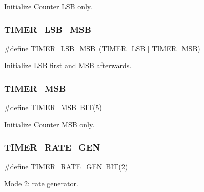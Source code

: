 Initialize Counter L\+SB only. 

\mbox{\label{group__i8254_ga8c0f1933323274c765e23837e4fbc8c7}} 
\subsubsection{\texorpdfstring{TIMER\_LSB\_MSB}{TIMER\_LSB\_MSB}}
{\footnotesize\ttfamily \#define T\+I\+M\+E\+R\+\_\+\+L\+S\+B\+\_\+\+M\+SB~(\mbox{\hyperlink{group__i8254_gac18cb814ebd0d67235392c330e0e3504}{T\+I\+M\+E\+R\+\_\+\+L\+SB}} $\vert$ \mbox{\hyperlink{group__i8254_ga2a8a6d363c612d756cd8d78480f7cd04}{T\+I\+M\+E\+R\+\_\+\+M\+SB}})}



Initialize L\+SB first and M\+SB afterwards. 

\mbox{\label{group__i8254_ga2a8a6d363c612d756cd8d78480f7cd04}} 
\subsubsection{\texorpdfstring{TIMER\_MSB}{TIMER\_MSB}}
{\footnotesize\ttfamily \#define T\+I\+M\+E\+R\+\_\+\+M\+SB~\mbox{\hyperlink{realtimeclock_8h_a3a8ea58898cb58fc96013383d39f482c}{B\+IT}}(5)}



Initialize Counter M\+SB only. 

\mbox{\label{group__i8254_ga5d4449e0fa1cf4a4d107a48a04a1265f}} 
\subsubsection{\texorpdfstring{TIMER\_RATE\_GEN}{TIMER\_RATE\_GEN}}
{\footnotesize\ttfamily \#define T\+I\+M\+E\+R\+\_\+\+R\+A\+T\+E\+\_\+\+G\+EN~\mbox{\hyperlink{realtimeclock_8h_a3a8ea58898cb58fc96013383d39f482c}{B\+IT}}(2)}



Mode 2\+: rate generator. 

\mbox{\label{group__i8254_ga4c2eecbfb96744a9c2af71dba75ecb18}} 
